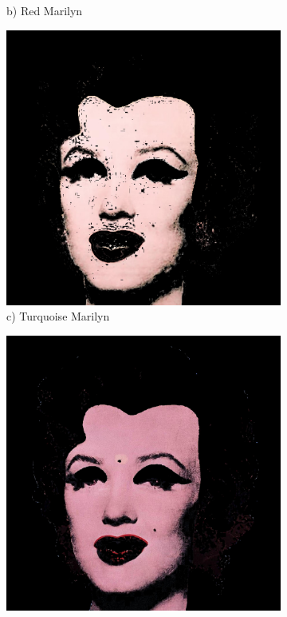 \documentclass{article}
\begin{document}
\begin{figure}[htbp]
\begin{subfigure}[b]{0.19\textwidth}
        \caption*{b) Red Marilyn}
    \end{subfigure}
    \hfill
    \begin{subfigure}[b]{0.19\textwidth}
        \includegraphics[width=\textwidth]{main_files/figure-latex/10_4_turq_marilyn_face_extraction.jpg}
        \caption*{c) Turquoise Marilyn}
    \end{subfigure}
    \hfill
    \begin{subfigure}[b]{0.19\textwidth}
        \includegraphics[width=\textwidth]{main_files/figure-latex/11_4_blue_marilyn_face_extraction.jpg}

\end{subfigure}
\end{figure}
\end{document}
